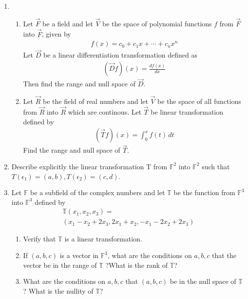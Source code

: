 \begin{enumerate}[label=\thesubsection.\arabic*.,ref=\thesubsection.\theenumi]
\item \begin{enumerate}[label=\emph{\alph*)}]
\item
Let $\vec{F}$ be a field and let $\vec{V}$ be the space of polynomial functions $f$ from $\vec{F}$
into $\vec{F}$, given by
\begin{align*}
	f(x)=c_0+c_1x+\cdots +c_nx^n
\end{align*}
Let $\vec{D}$ be a linear differentiation transformation defined as
\begin{align*}
	(\vec{D}f)(x)=\frac{df(x)}{dx}
\end{align*}
Then find the range and null space of 
$\vec{D}$.\\
\item
Let $\vec{R}$ be the field of real numbers and let $\vec{V}$ be the space of all functions from 
$\vec{R}$ into $\vec{R}$ which are continous. Let $\vec{T}$ be linear transformation defined by
\begin{align*}
	(\vec{T}f)(x)=\int_{0}^{x} f(t)\,dt
\end{align*}
Find the range and null space of $\vec{T}$.
\end{enumerate}
%
\solution

%
\item Describe explicitly the linear transformation T from $\mathbb{F}^2$ into $\mathbb{F}^2$ such that  $T(\epsilon_1 )=(a,b),T(\epsilon_2 )=(c,d)$.
%
\solution

%
\item Let $\mathbb{F}$ be a subfield of the complex numbers and let $\mathbb{T}$ be the function from $\mathbb{F}^3$ into $\mathbb{F}^3$ defined by 
\begin{align}
    \mathbb{T}(x_1,x_2,x_3)=\\(x_1-x_2+2x_3,2x_1+x_2,-x_1-2x_2+2x_3)
\end{align}
\begin{enumerate}
\item  Verify that $\mathbb{T}$ is a linear transformation.\\
\item  If $(a,b,c)$ is a vector in  $\mathbb{F}^3$, what are the conditions on $a,b,c$ that the vector be in the range of  $\mathbb{T}$ ?What is the rank of  $\mathbb{T}$?\\
\item  What are the conditions on $a,b,c$ that $(a,b,c)$ be in the null space of  
$\mathbb{T}$? What is the nullity of  $\mathbb{T}$?
\end{enumerate}

\end{enumerate}
